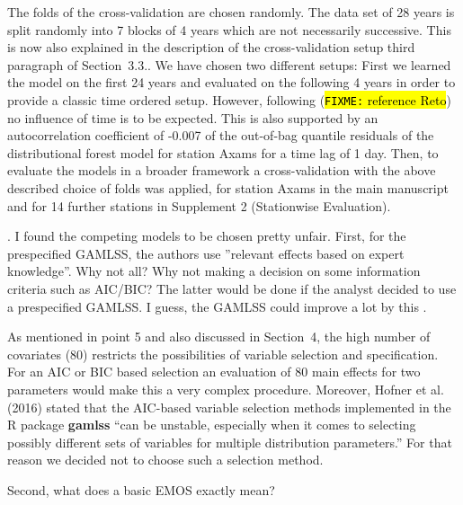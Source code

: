 \documentclass[american,foldmarks=false,noconfig]{uibklttr}
\newenvironment{review}{\fontshape{\itdefault}\fontseries{\bfdefault} \selectfont \smallskip}{\par}
\begin{document}
The folds of the cross-validation are chosen randomly. The data 
set of 28 years is split randomly into 7 blocks of 4 years which 
are not necessarily successive. This is now also explained in the 
description of the cross-validation setup third paragraph of 
Section~3.3..
We have chosen two different setups: First we learned the model
on the first 24 years and evaluated on the following 4 years
in order to provide a classic time ordered setup. 
However, following (\hl{\texttt{FIXME:} reference Reto})
no influence of time is to be expected. This is also supported by an 
autocorrelation coefficient of -0.007 of the out-of-bag quantile 
residuals of the distributional forest model for station Axams for
a time lag of 1 day.
Then, to evaluate the models in a broader framework a cross-validation 
with the above described choice of folds was applied, for station
Axams in the main manuscript and for 14 further stations in 
Supplement 2 (Stationwise Evaluation).


\begin{review}
8. I found the competing models to be chosen pretty unfair. 
First, for the prespecified GAMLSS, the authors use 
”relevant effects based on expert knowledge”. Why not all? 
Why not making a decision on some information criteria such as AIC/BIC? 
The latter would be done if the analyst decided to use a prespecified 
GAMLSS. I guess, the GAMLSS could improve a lot by this . 
\end{review}

As mentioned in point 5 and also discussed in Section~4, the high
number of covariates (80) restricts the possibilities of variable selection
and specification. For an AIC or BIC based selection an evaluation
of 80 main effects for two parameters would make this a very complex
procedure. Moreover, Hofner et al. (2016) stated that the 
AIC-based variable selection methods implemented in the \textsf{R} 
package \textbf{gamlss} ``can be unstable, especially when it comes 
to selecting possibly different sets of variables for 
multiple distribution parameters.'' For that reason we decided
not to choose such a selection method.

\begin{review}
Second, what does a basic EMOS exactly mean? 
\end{review}
\end{document}
